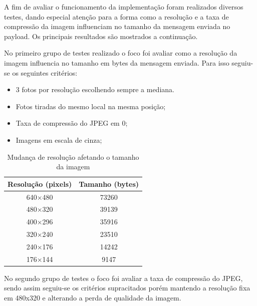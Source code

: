 \documentclass[
article,			%
12pt,				%
oneside,			%
a4paper,			%
english,			%
brazil,				%
sumario=tradicional
]{abntex2}
\begin{document}
A fim de avaliar o funcionamento da implementação foram realizados diversos testes, dando especial atenção para a forma como a resolução e a taxa de compressão da imagem influenciam no tamanho da mensagem enviada no payload. Os principais resultados são mostrados a continuação.

No primeiro grupo de testes realizado o foco foi avaliar como a resolução da imagem influencia no tamanho em bytes da mensagem enviada. Para isso seguiu-se os seguintes critérios:
\cleardoublepage
\begin{itemize}
    \setlength\itemsep{0.01cm}
    \item 3 fotos por resolução escolhendo sempre a mediana.
    \item Fotos tiradas do mesmo local na mesma posição;
    \item Taxa de compressão do JPEG em 0;
    \item Imagens em escala de cinza;
\end{itemize}

\begin{table}[!h]
\centering
\begin{tabular}{@{}c|c@{}}
\toprule
Resolução (pixels) & Tamanho (bytes) \\ \midrule
640$\times$480            & 73260           \\
480$\times$320            & 39139           \\
400$\times$296            & 35916           \\
320$\times$240            & 23510           \\
240$\times$176            & 14242           \\
176$\times$144            & 9147            \\ \bottomrule
\end{tabular}
\caption{Mudança de resolução afetando o tamanho da imagem}
\label{tab:resolution}
\end{table}

No segundo grupo de testes o foco foi avaliar a taxa de compressão do JPEG, sendo assim seguiu-se os critérios supracitados porém mantendo a resolução fixa em 480x320 e alterando a perda de qualidade da imagem.
\end{document}
